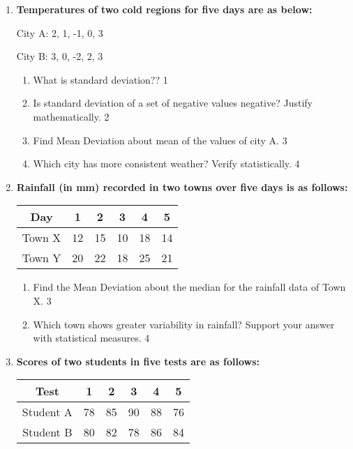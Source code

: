 \documentclass[a4paper,oneside]{book}
\begin{document}
\begin{enumerate}
    \item
  \textbf{Temperatures of two cold regions for five days are as below:}

    \begin{center}

    City A: 2, 1, -1, 0, 3

    City B: 3, 0, -2, 2, 3
    
    \end{center}
  \begin{enumerate}
    \item
	What is standard deviation?? \hfill 1
    \item
	Is standard deviation of a set of negative values negative? Justify mathematically. \hfill 2
    \item  
	Find Mean Deviation about mean of the values of city A.  \hfill 3
    \item
	Which city has more consistent weather? Verify statistically. \hfill 4
\end{enumerate}

\item  
  \textbf{Rainfall (in mm) recorded in two towns over five days is as follows:}

\begin{table}[h]
\centering
\begin{tabular}{c|ccccc}
Day     & 1  & 2  & 3  & 4  & 5  \\ \hline
Town X  & 12 & 15 & 10 & 18 & 14 \\
Town Y  & 20 & 22 & 18 & 25 & 21
\end{tabular}
\end{table}


  \begin{enumerate}
    \item  
	Find the Mean Deviation about the median for the rainfall data of Town X.  \hfill 3  
    \item  
	Which town shows greater variability in rainfall? Support your answer with statistical measures.  \hfill 4  
\end{enumerate}

\item  
  \textbf{Scores of two students in five tests are as follows:}

\begin{table}[h]
\centering
\begin{tabular}{c|ccccc}
Test     & 1  & 2  & 3  & 4  & 5  \\ \hline
Student A  & 78 & 85 & 90 & 88 & 76 \\ 
Student B  & 80 & 82 & 78 & 86 & 84
\end{tabular}
\end{table}


\end{enumerate}
\end{document}
